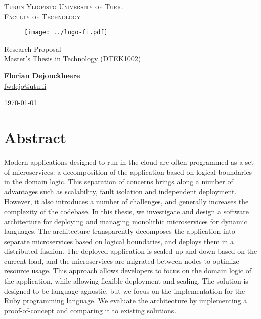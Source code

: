 \documentclass[12pt]{article}
\makeatletter
\newcommand{\faculty}{Faculty of Technology}
\newcommand{\course}{Master's Thesis in Technology (DTEK1002)}
\newcommand{\documenttitle}{Research Proposal}
\newcommand{\authorname}{Florian Dejonckheere}
\newcommand{\authoremail}{fwdejo@utu.fi}
\newcommand{\documentdate}{\today}
\makeatother
\begin{document}
	\begin{titlepage}
		\begin{center}
			\textsc{Turun Yliopisto \textemdash \hspace{1mm} University of Turku} \\
			\textsc{\faculty}
		\end{center}
		\begin{figure}[h]
			\vspace{10mm}

			\centering\texttt{[image: ../logo-fi.pdf]}

			\vspace{20mm}
		\end{figure}
		\begin{center}
			\fontsize{10mm}{7mm}\selectfont
			\textup{\documenttitle} \\
			\textnormal{ \Large{\course}} \\

			\vspace{25mm}

			\large{\textbf{\authorname}} \\
			\large{\href{mailto:\authoremail}{\authoremail}} \\

			\vspace{35mm}

			\documentdate
		\end{center}
	\end{titlepage}

	\clearpage


	\tableofcontents

	\cleardoublepage


	\section{Abstract}

	Modern applications designed to run in the cloud are often programmed as a set of microservices: a decomposition of the application based on logical boundaries in the domain logic.
	This separation of concerns brings along a number of advantages such as scalability, fault isolation and independent deployment.
	However, it also introduces a number of challenges, and generally increases the complexity of the codebase.
	In this thesis, we investigate and design a software architecture for deploying and managing monolithic microservices for dynamic languages.
	The architecture transparently decomposes the application into separate microservices based on logical boundaries, and deploys them in a distributed fashion.
	The deployed application is scaled up and down based on the current load, and the microservices are migrated between nodes to optimize resource usage.
	This approach allows developers to focus on the domain logic of the application, while allowing flexible deployment and scaling.
	The solution is designed to be language-agnostic, but we focus on the implementation for the Ruby programming language.
	We evaluate the architecture by implementing a proof-of-concept and comparing it to existing solutions.
\end{document}

